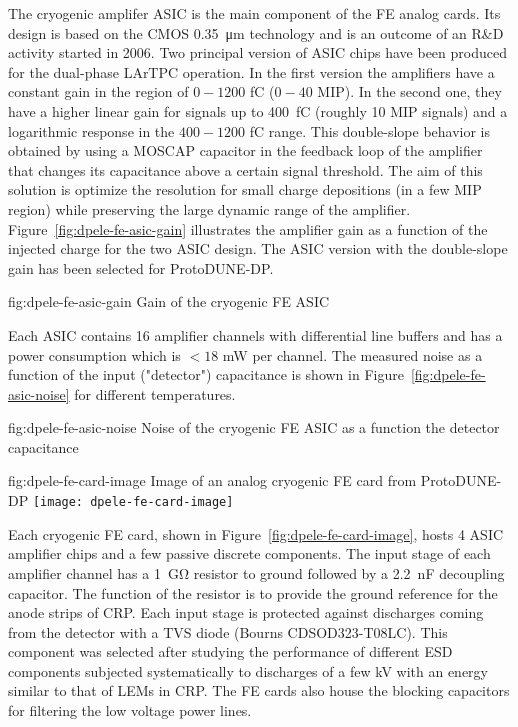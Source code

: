 The cryogenic amplifer ASIC is the main component of the FE analog cards. Its design is based on the CMOS \SI{0.35}{\micro\meter} technology and is an outcome of an R\&D  activity started in 2006. Two principal version of ASIC chips have been produced for the dual-phase LArTPC operation. In the first version the amplifiers have a constant gain in the region of $0-1200$ \si{\femto\coulomb} ($0-40$ MIP). In the second one, they have a higher linear gain for signals up to \SI{400}{\femto\coulomb} (roughly 10 MIP signals) and a logarithmic response in the  $400-1200$ \si{\femto\coulomb} range. This double-slope behavior is obtained by using a MOSCAP capacitor in the feedback loop of the amplifier that changes its capacitance above a certain signal threshold. The aim of this solution is optimize the resolution for small charge depositions (in a few MIP region) while preserving the large dynamic range of the amplifier. Figure~\ref{fig:dpele-fe-asic-gain} illustrates the amplifier gain as a function of the injected charge for the two ASIC design. The ASIC version with the double-slope gain has been selected for ProtoDUNE-DP. 

\begin{dunefigure}{fig:dpele-fe-asic-gain}
{Gain of the cryogenic FE ASIC}
\end{dunefigure}

Each ASIC contains 16 amplifier channels with differential line buffers and has a power consumption which is $<18$ mW per channel. The measured noise as a function of the input ("detector")  capacitance is shown in Figure~\ref{fig:dpele-fe-asic-noise} for different temperatures.  

\begin{dunefigure}{fig:dpele-fe-asic-noise}
{Noise of the cryogenic FE ASIC as a function the detector capacitance}
\end{dunefigure}

\begin{dunefigure}{fig:dpele-fe-card-image}
{Image of an analog cryogenic FE card from ProtoDUNE-DP}
\texttt{[image: dpele-fe-card-image]}
\end{dunefigure}

Each cryogenic FE card, shown in Figure~\ref{fig:dpele-fe-card-image}, hosts 4 ASIC amplifier chips and a few passive discrete components. The input stage of each amplifier channel has a \SI{1}{\giga\ohm} resistor to ground followed by a \SI{2.2}{\nano\farad} decoupling capacitor. The function of the resistor is to provide the ground reference for the anode strips of CRP. Each input stage is protected against discharges coming from the detector with a TVS diode (Bourns CDSOD323-T08LC). This component was selected after studying the performance of different ESD components subjected systematically to discharges of a few kV with an energy similar to that of LEMs in CRP. The FE cards also house the blocking capacitors for filtering the low voltage power lines.


